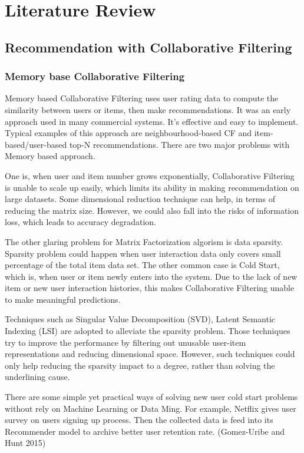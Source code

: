 \section{Literature Review}

\subsection{Recommendation with Collaborative Filtering}
\subsubsection{Memory base Collaborative Filtering}

Memory based Collaborative Filtering uses user rating data to compute the similarity between users or items, then make recommendations. It was an early approach used in many commercial systems. It's effective and easy to implement. Typical examples of this approach are neighbourhood-based CF and item-based/user-based top-N recommendations. There are two major problems with Memory based approach.  

One is, when user and item number grows exponentially, Collaborative Filtering is unable to scale up easily, which limits its ability in making recommendation on large datasets. Some dimensional reduction technique can help, in terms of reducing the matrix size. However, we could also fall into the risks of information loss, which leads to accuracy degradation.  

The other glaring problem for Matrix Factorization algorism is data sparsity. Sparsity problem could happen when user interaction data only covers small percentage of the total item data set. The other common case is Cold Start, which is, when user or item newly enters into the system. Due to the lack of new item or new user interaction histories, this makes Collaborative Filtering unable to make meaningful predictions.  

Techniques such as Singular Value Decomposition (SVD), Latent Semantic Indexing (LSI) are adopted to alleviate the sparsity problem. Those techniques try to improve the performance by filtering out unusable user-item representations and reducing dimensional space. However, such techniques could only help reducing the sparsity impact to a degree, rather than solving the underlining cause. 

There are some simple yet practical ways of solving new user cold start problems without rely on Machine Learning or Data Ming. For example, Netflix gives user survey on users signing up process. Then the collected data is feed into its Recommender model to archive better user retention rate. (Gomez-Uribe and Hunt 2015) 


